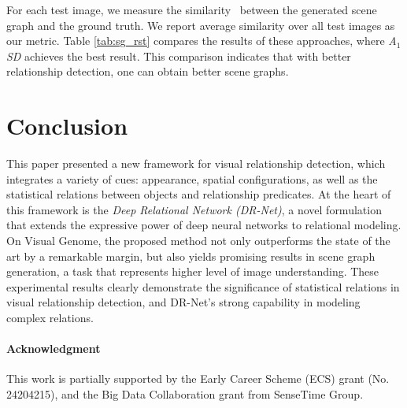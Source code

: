 \documentclass[10pt,twocolumn,letterpaper]{article}
\begin{document}
For each test image, we measure the similarity~\cite{champin2003measuring} between the generated scene graph and the ground truth.
We report average similarity over all test images as our metric.
Table \ref{tab:sg_rst} compares the results of these approaches,
where \emph{A$_1$SD} achieves the best result.
This comparison indicates that
with better relationship detection, one can obtain better scene graphs.

\section{Conclusion}\label{sec:concls}This paper presented a new framework for visual relationship detection,
which integrates a variety of cues: appearance, spatial configurations,
as well as the statistical relations between objects and relationship predicates.
%
At the heart of this framework is the \emph{Deep Relational Network (DR-Net)},
a novel formulation that extends the expressive power of deep neural networks
to relational modeling.
%
On Visual Genome, the proposed method not only outperforms the state of the art
by a remarkable margin,
but also yields promising results in scene graph generation, a task that
represents higher level of image understanding.
%
These experimental results clearly demonstrate the significance of
statistical relations in visual relationship detection,
and DR-Net's strong capability in modeling complex relations.

\vspace{-10pt}\paragraph{Acknowledgment}

This work is partially supported by
the Early Career Scheme (ECS) grant (No. 24204215), and
the Big Data Collaboration grant from SenseTime Group.


{\small
%


}
\end{document}
